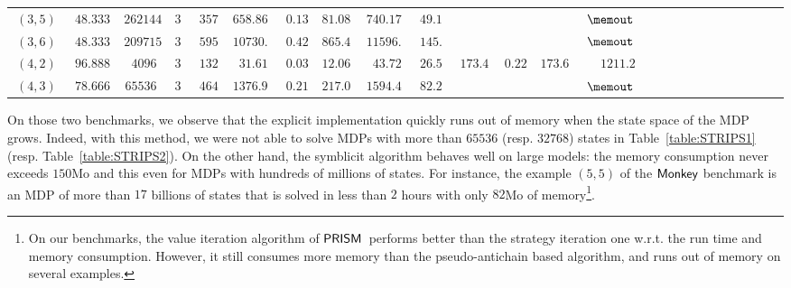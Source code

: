 \begin{table}[h!]
\begin{tabular}{|r|r|r||r|r|r|r|r|r|r||r|r|r|r|r|r|r|r|r|r|r|r|r|r|r|}
$\ (3,5)\ $ & $\ 48.3333\ $ & $\ 262144\ $ & $\ 3\ $ & $\ 357\ $ & $\ 658.86\ $ & $\ 0.13\ $ & $\ 81.08\ $  & $\ 740.17\ $ & $\ 49.1\ $ & $\ \ $ & $\ \ $  & $\ \ $ & $\ \memout\ $\rule[-3pt]{0pt}{10pt}\\
$\ (3,6)\ $ & $\ 48.3333\ $ & $\ 2097152\ $ & $\ 3\ $ & $\ 595\ $ & $\ 10730.09\ $ & $\ 0.42\ $ & $\ 865.48\ $  & $\ 11596.71\ $ & $\ 145.8\ $ & $\ \ $ & $\ \ $  & $\ \ $ & $\ \memout\ $\rule[-3pt]{0pt}{10pt}\\
\hline $\ (4,2)\ $ & $\ 96.8889\ $ & $\ 4096\ $ & $\ 3\ $ & $\ 132\ $ & $\ 31.61\ $ & $\ 0.03\ $ & $\ 12.06\ $  & $\ 43.72\ $ & $\ 26.5\ $ & $\ 173.40\ $ & $\ 0.22\ $  & $\ 173.62\ $ & $\ 1211.2\ $\rule[-3pt]{0pt}{10pt}\\
$\ (4,3)\ $ & $\ 78.6667\ $ & $\ 65536\ $ & $\ 3\ $ & $\ 464\ $ & $\ 1376.94\ $ & $\ 0.21\ $ & $\ 217.06\ $  & $\ 1594.48\ $ & $\ 82.2\ $ & $\ \ $ & $\ \ $  & $\ \ $ & $\ \memout\ $\rule[-3pt]{0pt}{10pt}\\
\hline
		\end{tabular}
	\normalsize
\end{table}

On those two benchmarks, we observe that the explicit implementation quickly runs out of memory when the state space of the MDP grows. Indeed, with this method, we were not able to solve MDPs with more than $65536$ (resp. $32768$) states in Table~\ref{table:STRIPS1} (resp. Table~\ref{table:STRIPS2}). On the other hand, the symblicit algorithm behaves well on large models: the memory consumption never exceeds $150$Mo and this even for MDPs with hundreds of millions of states. For instance, the example $(5, 5)$ of the $\sf{Monkey}$ benchmark is an MDP of more than $17$ billions of states that is solved in less than $2$ hours with only $82$Mo of memory\footnote{On our benchmarks, the value iteration algorithm of ${\sf PRISM}$~performs better than the strategy iteration one w.r.t. the run time and memory consumption. However, it still consumes more memory than the pseudo-antichain based algorithm, and runs out of memory on several examples.}.



